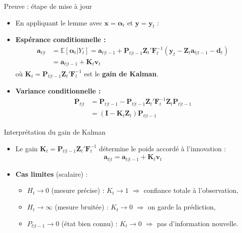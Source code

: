 \documentclass[11pt,aspectratio=169]{beamer}
\newcommand{\E}{\mathbb{E}}
\begin{document}
\begin{frame}{Preuve : étape de mise à jour}

\begin{itemize}

\item En appliquant le lemme avec $\bm{x} = \bm{\alpha}_t$ et $\bm{y} = \bm{y}_t$ :\newline

\item \textbf{Espérance conditionnelle :}
  \begin{align*}
  \bm{a}_{t|t} &= \E[\bm{\alpha}_t | Y_t] = \bm{a}_{t|t-1} + \bm{P}_{t|t-1} \bm{Z}_t' \bm{F}_t^{-1} (\bm{y}_t - \bm{Z}_t \bm{a}_{t|t-1} - \bm{d}_t) \\
  &= \bm{a}_{t|t-1} + \bm{K}_t \bm{v}_t
  \end{align*}
  où $\bm{K}_t = \bm{P}_{t|t-1} \bm{Z}_t' \bm{F}_t^{-1}$ est le \textbf{gain de Kalman}.\newline

\item \textbf{Variance conditionnelle :}
  \begin{align*}
  \bm{P}_{t|t} &= \bm{P}_{t|t-1} - \bm{P}_{t|t-1} \bm{Z}_t' \bm{F}_t^{-1} \bm{Z}_t \bm{P}_{t|t-1} \\
  &= (\bm{I} - \bm{K}_t \bm{Z}_t) \bm{P}_{t|t-1}
  \end{align*}

\end{itemize}

\end{frame}

\begin{frame}{Interprétation du gain de Kalman}

\begin{itemize}

\item Le gain $\bm{K}_t = \bm{P}_{t|t-1} \bm{Z}_t' \bm{F}_t^{-1}$ détermine le poids accordé à l'innovation :
  \[
  \bm{a}_{t|t} = \bm{a}_{t|t-1} + \bm{K}_t \bm{v}_t
  \]\newline

\item \textbf{Cas limites} (scalaire) :
  \begin{itemize}
  \item $H_t \to 0$ (mesure précise) : $K_t \to 1$ $\Rightarrow$ confiance totale à l'observation,
  \item $H_t \to \infty$ (mesure bruitée) : $K_t \to 0$ $\Rightarrow$ on garde la prédiction,
  \item $P_{t|t-1} \to 0$ (état bien connu) : $K_t \to 0$ $\Rightarrow$ pas d'information nouvelle.
  \end{itemize}

\end{itemize}

\end{frame}
\end{document}
